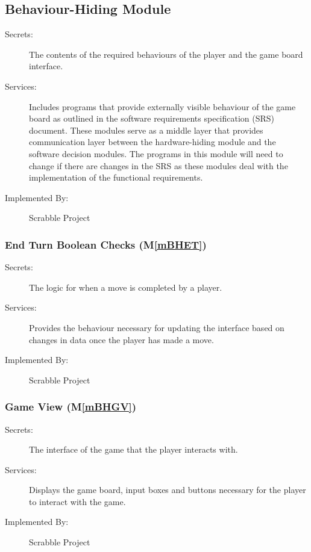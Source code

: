 \documentclass[12pt, titlepage]{article}
\newcommand{\mref}[1]{M\ref{#1}}
\begin{document}
\subsection{Behaviour-Hiding Module}
\begin{description}
\item[Secrets:]The contents of the required behaviours of the player and the game board interface.
\item[Services:]Includes programs that provide externally visible behaviour of
  the game board as outlined in the software requirements specification (SRS)
  document. These modules serve as a middle layer that provides communication layer between the hardware-hiding module and the software decision modules. The programs in this module will need to change if there are changes in the SRS as these modules deal with the implementation of the functional requirements.
\item[Implemented By:] Scrabble Project
\end{description}

\subsubsection{End Turn Boolean Checks (\mref{mBHET})}
\begin{description}
\item[Secrets:]The logic for when a move is completed by a player.
\item[Services:] Provides the behaviour necessary for updating the interface based on changes in data once the player has made a move.
\item[Implemented By:] Scrabble Project
\end{description}

\subsubsection{Game View (\mref{mBHGV})}
\begin{description}
\item[Secrets:]The interface of the game that the player interacts with.
\item[Services:]Displays the game board, input boxes and buttons necessary for the player to interact with the game.
\item[Implemented By:] Scrabble Project
\end{description}
\end{document}
